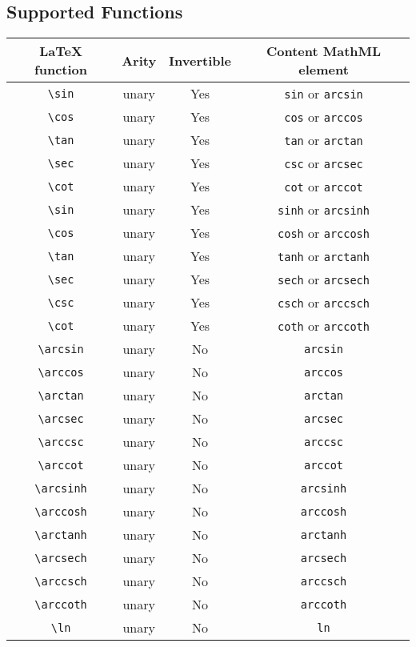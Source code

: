 \subsection*{Supported Functions}

\begin{tabular}{|c|c|c|c|}
\hline
LaTeX function & Arity & Invertible & Content MathML element \\
\hline
\verb|\sin| & unary & Yes & \verb|sin| or \verb|arcsin| \\
\verb|\cos| & unary & Yes & \verb|cos| or \verb|arccos| \\
\verb|\tan| & unary & Yes & \verb|tan| or \verb|arctan| \\
\verb|\sec| & unary & Yes & \verb|csc| or \verb|arcsec| \\
\verb|\cot| & unary & Yes & \verb|cot| or \verb|arccot| \\
\verb|\sin| & unary & Yes & \verb|sinh| or \verb|arcsinh| \\
\verb|\cos| & unary & Yes & \verb|cosh| or \verb|arccosh| \\
\verb|\tan| & unary & Yes & \verb|tanh| or \verb|arctanh| \\
\verb|\sec| & unary & Yes & \verb|sech| or \verb|arcsech| \\
\verb|\csc| & unary & Yes & \verb|csch| or \verb|arccsch| \\
\verb|\cot| & unary & Yes & \verb|coth| or \verb|arccoth| \\
\verb|\arcsin| & unary & No & \verb|arcsin| \\
\verb|\arccos| & unary & No & \verb|arccos| \\
\verb|\arctan| & unary & No & \verb|arctan| \\
\verb|\arcsec| & unary & No & \verb|arcsec| \\
\verb|\arccsc| & unary & No & \verb|arccsc| \\
\verb|\arccot| & unary & No & \verb|arccot| \\
\verb|\arcsinh| & unary & No & \verb|arcsinh| \\
\verb|\arccosh| & unary & No & \verb|arccosh| \\
\verb|\arctanh| & unary & No & \verb|arctanh| \\
\verb|\arcsech| & unary & No & \verb|arcsech| \\
\verb|\arccsch| & unary & No & \verb|arccsch| \\
\verb|\arccoth| & unary & No & \verb|arccoth| \\
\verb|\ln| & unary & No & \verb|ln| \\

\end{tabular}
